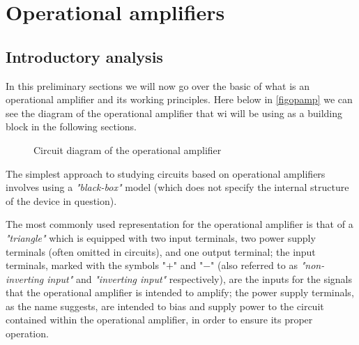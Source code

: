 \documentclass[../main.tex]{subfiles}
\begin{document}
\clearpage
\thispagestyle{empty}
\vspace*{7cm}
\section{Operational amplifiers}
\vspace*{1.5cm}

\subsection{Introductory analysis}

In this preliminary sections we will now go over the basic of what is an operational amplifier and its working principles.
Here below in \autoref{figopamp} we can see the diagram of the operational amplifier that wi will be using as a building block in the following sections.


\begin{figure}[h!]
\begin{center}


\caption{Circuit diagram of the operational amplifier}
\label{figopamp}	
\end{center}	
\end{figure}


The simplest approach to studying circuits based on operational amplifiers involves using a \textit{"black-box"} model (which does not specify the internal structure of the device in question). 

The most commonly used representation for the operational amplifier is that of a \textit{"triangle"} which is equipped with two input terminals, two power supply terminals (often omitted in circuits), and one output terminal; the input terminals, marked with the symbols "$+$" and "$-$" (also referred to as \textit{"non-inverting input"} and \textit{"inverting input"} respectively), are the inputs for the signals that the operational amplifier is intended to amplify; the power supply terminals, as the name suggests, are intended to bias and supply power to the circuit contained within the operational amplifier, in order to ensure its proper operation.\\
\end{document}
